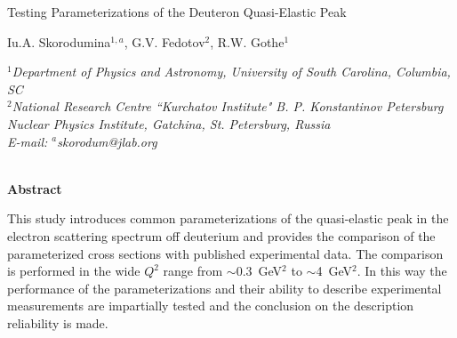 \noindent\begin{minipage}{\textwidth}
\begin{center}
\thispagestyle{empty}
\vspace{0.5cm}
{ \Large{Testing Parameterizations of the Deuteron Quasi-Elastic Peak}}\\
\vspace{1cm}

{\large Iu.A. Skorodumina$^{1, a}$, G.V. Fedotov$^{2}$,  R.W. Gothe$^{1}$} \\[16pt]

\parbox{.86\textwidth}{\centering\footnotesize\it
$^1$Department of Physics and Astronomy, University of South Carolina, Columbia, SC\\[8pt]
$^2$National Research Centre ``Kurchatov Institute" B. P. Konstantinov Petersburg Nuclear Physics Institute, Gatchina, St. Petersburg, Russia\\
[20pt]
E-mail: $^a$skorodum@jlab.org}\\


\vspace{2cm}
{\bf Abstract}\\[9pt]

\end{center}
{\small This study introduces common parameterizations of the quasi-elastic peak in the electron scattering spectrum off deuterium and provides the comparison of the parameterized cross sections with published experimental data. The comparison is performed in the wide $Q^{2}$ range from $\sim$0.3~GeV$^{2}$ to $\sim$4~GeV$^{2}$. In this way the performance of the parameterizations and their ability to describe experimental measurements are impartially tested and the conclusion on the description reliability is made.}


\end{minipage}

